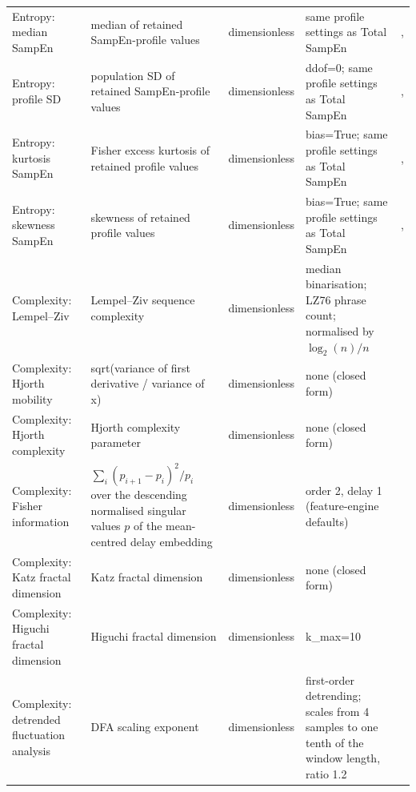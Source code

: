 \documentclass[10pt]{article}
\begin{document}
\begin{longtable}{p{3.4cm}p{6.2cm}p{2.0cm}p{4.7cm}p{3.2cm}}
Entropy: median SampEn & median of retained SampEn-profile values & dimensionless & same profile settings as Total SampEn & \citep{Udhayakumar2018SampEnProfile},\citep{udhayakumar2020entropycodes} \\
Entropy: profile SD & population SD of retained SampEn-profile values & dimensionless & ddof=0; same profile settings as Total SampEn & \citep{Udhayakumar2018SampEnProfile},\citep{udhayakumar2020entropycodes} \\
Entropy: kurtosis SampEn & Fisher excess kurtosis of retained profile values & dimensionless & bias=True; same profile settings as Total SampEn & \citep{Udhayakumar2018SampEnProfile},\citep{udhayakumar2020entropycodes} \\
Entropy: skewness SampEn & skewness of retained profile values & dimensionless & bias=True; same profile settings as Total SampEn & \citep{Udhayakumar2018SampEnProfile},\citep{udhayakumar2020entropycodes} \\
Complexity: Lempel--Ziv & Lempel--Ziv sequence complexity & dimensionless & median binarisation; LZ76 phrase count; normalised by $\log_2(n)/n$ & \citep{Lempel1976Complexity} \\
Complexity: Hjorth mobility & sqrt(variance of first derivative / variance of x) & dimensionless & none (closed form) & \citep{Hjorth1970Parameters} \\
Complexity: Hjorth complexity & Hjorth complexity parameter & dimensionless & none (closed form) & \citep{Hjorth1970Parameters} \\
Complexity: Fisher information & $\sum_i (p_{i+1}-p_i)^2/p_i$ over the descending normalised singular values $p$ of the mean-centred delay embedding & dimensionless & order 2, delay 1 (feature-engine defaults) &  \\
Complexity: Katz fractal dimension & Katz fractal dimension & dimensionless & none (closed form) & \citep{Katz1988FractalWaveforms} \\
Complexity: Higuchi fractal dimension & Higuchi fractal dimension & dimensionless & k\_max=10 & \citep{Higuchi1988FractalDimension} \\
Complexity: detrended fluctuation analysis & DFA scaling exponent & dimensionless & first-order detrending; scales from 4 samples to one tenth of the window length, ratio 1.2 & \citep{Peng1994DFA} \\
\bottomrule
\end{longtable}
\end{document}
